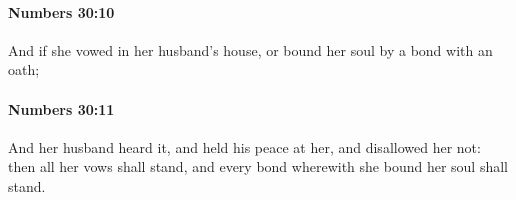 		\paragraph{Numbers 30:10} %
			\label{NUMBERS-30-10}

			And if she vowed in her husband’s house, or bound her soul by a bond with an oath;


		\paragraph{Numbers 30:11} %
			\label{NUMBERS-30-11}

			And her husband heard it, and held his peace at her, and disallowed her not: then all her vows shall stand, and every bond wherewith she bound her soul shall stand.


